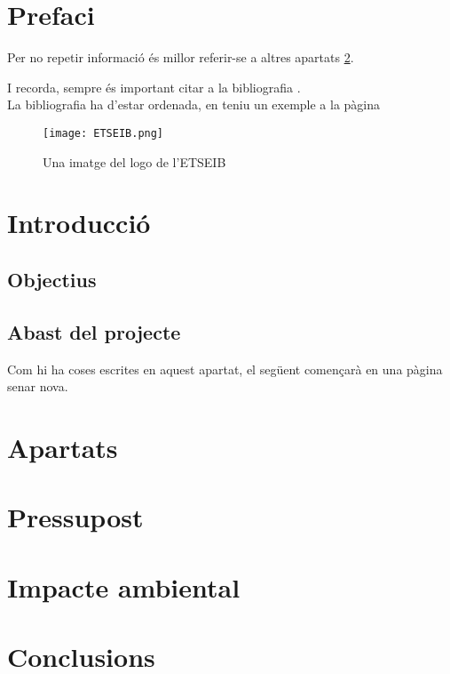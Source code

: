 \documentclass[a4paper,11pt, titlepage, twoside]{article}
\begin{document}
\tableofcontents
\listoffigures


\section{Prefaci}
Per no repetir informació és millor referir-se a altres apartats \ref{introducció}.\par
I recorda, sempre és important citar a la bibliografia \cite{Etiqueta}.\\
La bibliografia ha d'estar ordenada, en teniu un exemple a la pàgina \pageref{biblio}

\begin{figure}[H] %
	\centering
	\texttt{[image: ETSEIB.png]}
	\caption{Una imatge del logo de l'ETSEIB}
	\label{fig:ETSEIB} %
\end{figure}

\section{Introducció}\label{introducció}
\subsection{Objectius}
\subsection{Abast del projecte}
Com hi ha coses escrites en aquest apartat, el següent començarà en una pàgina senar nova.
\section{Apartats}

\section{Pressupost}

\section{Impacte ambiental}

\section*{Conclusions}
 
\end{document}
